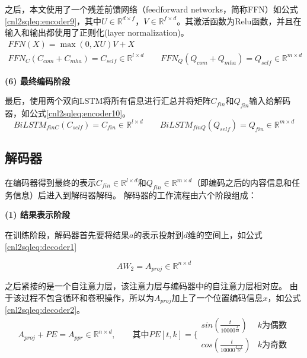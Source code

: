 之后，本文使用了一个残差前馈网络（feedforward networks，简称FFN）如公式\ref{cnl2sqleq:encoder9}，其中$U \in \mathbb{R}^{d \times f}$，$V \in \mathbb{R}^{f \times d}$。其激活函数为Relu函数\cite{Nair2010Rectified,vaswani2017attention}，并且在输入和输出都使用了正则化(layer normalization)\cite{Ba2016Layer}。
\begin{gather}
  \label{cnl2sqleq:encoder9}
  FFN(X) = \max(0,XU)V + X\\
  FFN_C(C_{com} + C_{mha}) = C_{self} \in \mathbb{R}^{l \times d} \qquad FFN_Q(Q_{com} + Q_{mha}) = Q_{self} \in \mathbb{R}^{m \times d}
\end{gather}

\textbf{(6) 最终编码阶段}

最后，使用两个双向LSTM将所有信息进行汇总并将矩阵$C_{fin}$和$Q_{fin}$输入给解码器，如公式\ref{cnl2sqleq:encoder10}。
\begin{equation}
  \label{cnl2sqleq:encoder10}
  BiLSTM_{finC}(C_{self}) = C_{fin} \in \mathbb{R}^{l \times d} \qquad BiLSTM_{finQ}(Q_{self}) = Q_{fin} \in \mathbb{R}^{m \times d} 
\end{equation}


\subsection{解码器}
\label{cnl2sql:decoder}

在编码器得到最终的表示$C_{fin} \in \mathbb{R}^{l \times d}$和$Q_{fin} \in \mathbb{R}^{m \times d}$（即编码之后的内容信息和任务信息）后进入到解码器解码。
解码器的工作流程由六个阶段组成：

\textbf{(1) 结果表示阶段}

在训练阶段，解码器首先要将结果$a$的表示投射到$d$维的空间上，如公式\ref{cnl2sqleq:decoder1}

\begin{equation}
  \label{cnl2sqleq:decoder1}
  AW_2 = A_{proj} \in \mathbb{R}^{n \times d} 
\end{equation}

之后紧接的是一个自注意力层，该注意力层与编码器中的自注意力层相对应。
由于该过程不包含循环和卷积操作，所以为$A_{proj}$加上了一个位置编码信息$x$，如公式\ref{cnl2sqleq:decoder2}。
\begin{equation}
  \label{cnl2sqleq:decoder2}
  A_{proj} + PE = A_{ppr} \in \mathbb{R}^{n \times d},\qquad \mbox{其中} PE[t,k] = \{   
  \begin{array}{lr}
    sin(\frac{t}{10000^{\frac{k}{2d}}}) &  k\mbox{为偶数}\\
    cos(\frac{t}{10000^{\frac{k-1}{2d}}}) &  k\mbox{为奇数}
  \end{array}
\end{equation}

